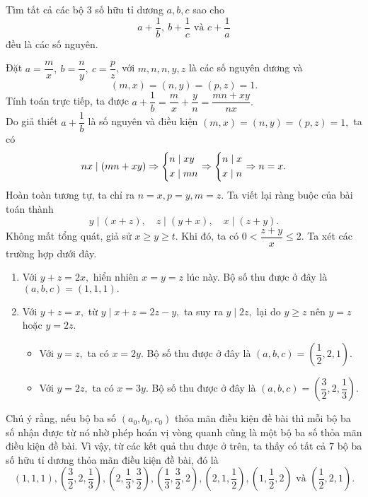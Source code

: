 \begin{gbtt}
Tìm tất cả các bộ $ 3 $ số hữu tỉ dương $ a, b, c $ sao cho 
$$a+\dfrac{1}{b},\ b + \dfrac{1}{c}\text{ và } c + \dfrac{1}{a} $$ đều là các số nguyên.	
\loigiai
{
Đặt $ a = \dfrac{m}{x},\ b = \dfrac{n}{y}, \ c = \dfrac{p}{z} $, với $m,n,n,y,z $ là các số nguyên dương và 
$$(m,x)=(n,y)=(p,z)=1. $$
Tính toán trực tiếp, ta được
$a + \dfrac{1}{b} = \dfrac{m}{x} + \dfrac{y}{n} = \dfrac{mn + xy}{nx}.$\\
Do giả thiết $a+\dfrac{1}{b}$ là số nguyên và điều kiện $(m,x)=(n,y)=(p,z)=1,$ ta có
$$nx\mid  (mn+xy) 
\Rightarrow \left\{\begin{aligned}&n\mid xy \\ &x\mid mn\end{aligned}\right.
\Rightarrow \left\{\begin{aligned}&n\mid x \\ &x\mid n\end{aligned}\right.\Rightarrow n=x.$$
Hoàn toàn tương tự, ta chỉ ra $n=x,p=y,m=z.$
Ta viết lại ràng buộc của bài toán thành
$$y\mid (x+z),\quad z\mid (y+x),\quad x\mid (z+y).$$
Không mất  tổng quát, giả sử $ x \geq y \geq t $. Khi đó,  ta có $ 0 < \dfrac{z + y}{x } \leq 2$. Ta xét các trường hợp dưới đây.
\begin{enumerate}
	\item Với $y+z=2x,$ hiển nhiên $x=y=z$ lúc này. Bộ số thu được ở đây là $(a,b,c)=(1,1,1).$
	\item Với $y+z=x,$ từ $y\mid x+z=2z-y,$ ta suy ra $y\mid 2z,$ lại do $y\ge z$ nên $y=z$ hoặc $y=2z.$
	\begin{itemize}
		\item{} Với $y=z,$ ta có $x=2y.$ Bộ số thu được ở đây là $(a,b,c)=\left(\dfrac{1}{2},2,1\right).$
		\item{} Với $y=2z,$ ta có $x=3y.$ Bộ số thu được ở đây là $(a,b,c)=\left(\dfrac{3}{2},2,\dfrac{1}{3}\right).$
	\end{itemize}	
\end{enumerate}	
Chú ý rằng, nếu bộ ba số $ (a_0, b_0, c_0) $ thỏa mãn điều kiện đề bài thì mỗi bộ ba số nhận được từ nó nhờ phép hoán vị vòng quanh cũng là một bộ ba số thỏa mãn điều kiện đề bài. Vì vậy, từ các kết quả thu được ở trên, ta thấy có tất cả $ 7 $ bộ ba số hữu tỉ dương thỏa mãn điều kiện đề bài, đó là $$ (1,1,1), \left ( \dfrac{3}{2}, 2, \dfrac{1}{3} \right ), \left ( 2, \dfrac{1}{3}, \dfrac{3}{2} \right ), \left (\dfrac{1}{3}, \dfrac{3}{2},2 \right ), \left ( 2,1, \dfrac{1}{2} \right ), \left ( 1,\dfrac{1}{2},2 \right ) \text{ và } \left ( \dfrac{1}{2}, 2, 1 \right ). $$}
\end{gbtt}


